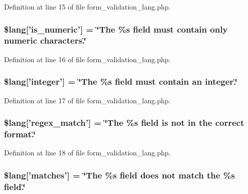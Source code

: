 Definition at line 15 of file form\-\_\-validation\-\_\-lang.\-php.

\subsubsection[{\$lang}]{\setlength{\rightskip}{0pt plus 5cm}\$lang['is\-\_\-numeric'] = \char`\"{}The \%{\bf s} field must contain only numeric characters.\char`\"{}}\label{form__validation__lang_8php_a39b379d8a1148337906321c8d2ce03ec}


Definition at line 16 of file form\-\_\-validation\-\_\-lang.\-php.

\subsubsection[{\$lang}]{\setlength{\rightskip}{0pt plus 5cm}\$lang['integer'] = \char`\"{}The \%{\bf s} field must contain an integer.\char`\"{}}\label{form__validation__lang_8php_a23b8cd7ec18c6e0c1f85613a06100f7e}


Definition at line 17 of file form\-\_\-validation\-\_\-lang.\-php.

\subsubsection[{\$lang}]{\setlength{\rightskip}{0pt plus 5cm}\$lang['regex\-\_\-match'] = \char`\"{}The \%{\bf s} field is {\bf not} in the correct format.\char`\"{}}\label{form__validation__lang_8php_aa10761f3ecf310c4b347672c3d7cc483}


Definition at line 18 of file form\-\_\-validation\-\_\-lang.\-php.

\subsubsection[{\$lang}]{\setlength{\rightskip}{0pt plus 5cm}\$lang['matches'] = \char`\"{}The \%{\bf s} field does {\bf not} match the \%{\bf s} field.\char`\"{}}\label{form__validation__lang_8php_a5a5299bf244783be43038a191bfdee03}


